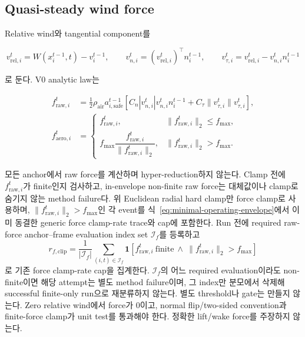 \documentclass[11pt]{article}
\begin{document}
\subsection{Quasi-steady wind force}

Relative wind와 tangential component를

\begin{equation}
  v_{\mathrm{rel},i}^t=W(x_i^{t-1},t)-v_i^{t-1},\qquad
  v_{n,i}^t=(v_{\mathrm{rel},i}^t)^\top n_i^{t-1},\qquad
  v_{\tau,i}^t=v_{\mathrm{rel},i}^t-v_{n,i}^tn_i^{t-1}
\end{equation}

로 둔다. V0 analytic law는

\begin{equation}
\begin{aligned}
  f_{\mathrm{raw},i}^t
  &=
  \frac12\rho_{\mathrm{air}}a_{i,\mathrm{safe}}^{t-1}
  \left[
    C_n|v_{n,i}^t|v_{n,i}^tn_i^{t-1}
    +C_\tau\|v_{\tau,i}^t\|v_{\tau,i}^t
  \right],\\
  f_{\mathrm{aero},i}^t
  &=
  \begin{cases}
    f_{\mathrm{raw},i}^t,
      & \|f_{\mathrm{raw},i}^t\|_2\leq f_{\max},\\
    f_{\max}\dfrac{f_{\mathrm{raw},i}^t}{\|f_{\mathrm{raw},i}^t\|_2},
      & \|f_{\mathrm{raw},i}^t\|_2>f_{\max}.
  \end{cases}
\end{aligned}
  \label{eq:minimal-aero}
\end{equation}

모든 anchor에서 raw force를 계산하며 hyper-reduction하지 않는다. Clamp 전에
\(f_{\mathrm{raw},i}^t\)가 finite인지 검사하고, in-envelope non-finite raw force는 대체값이나 clamp로
숨기지 않는 method failure다. 위 Euclidean radial hard clamp만 force clamp로 사용하며,
\(\|f_{\mathrm{raw},i}^t\|_2>f_{\max}\)인 각 event를 식~\eqref{eq:minimal-operating-envelope}에서 이미
동결한 generic force clamp-rate trace와 cap에 포함한다. Run 전에 required raw-force anchor--frame
evaluation index set \(\mathcal I_f\)를 등록하고
\[
  r_{f,\mathrm{clip}}
  =
  \frac{1}{|\mathcal I_f|}
  \sum_{(i,t)\in\mathcal I_f}
  \mathbf 1\!\left[
    f_{\mathrm{raw},i}^t\ \text{finite}
    \ \land\ \|f_{\mathrm{raw},i}^t\|_2>f_{\max}
  \right]
\]
로 기존 force clamp-rate cap을 집계한다. \(\mathcal I_f\)의 어느 required evaluation이라도 non-finite이면
해당 attempt는 별도 method failure이며, 그 index만 분모에서 삭제해 successful finite-only run으로
재분류하지 않는다. 별도 threshold나 gate는 만들지 않는다.
Zero relative wind에서 force가 0이고, normal flip/two-sided convention과
finite-force clamp가 unit test를 통과해야 한다.
정확한 lift/wake force를 주장하지 않는다.
\end{document}
